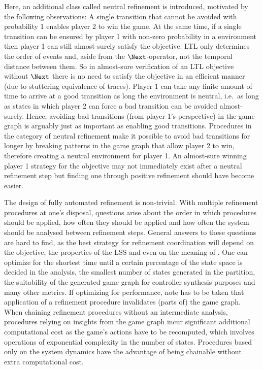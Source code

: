 Here, an additional class called neutral refinement is introduced, motivated by the following observations:
A single  transition that cannot be avoided with probability 1 enables player 2 to win the game.
At the same time, if a single  transition can be ensured by player 1 with non-zero probability in a  environment then player 1 can still almost-surely satisfy the objective. 
LTL only determines the order of events and, aside from the $\Next$-operator, not the temporal distance between them.
So in almost-sure verification of an LTL objective without $\Next$ there is no need to satisfy the objective in an efficient manner (due to stuttering equivalence of traces). %
Player 1 can take any finite amount of time to arrive at a good transition as long the environment is neutral, i.e.\ as long as states in which player 2 can force a bad transition can be avoided almost-surely.
Hence, avoiding bad transitions (from player 1's perspective) in the game graph is arguably just as important as enabling good transitions.
Procedures in the category of neutral refinement make it possible to avoid bad transitions for longer by breaking patterns in the game graph that allow player 2 to win, therefore creating a neutral environment for player 1.
An almost-sure winning player 1 strategy for the objective may not immediately exist after a neutral refinement step but finding one through positive refinement should have become easier.

The design of fully automated refinement is non-trivial.
With multiple refinement procedures at one's disposal, questions arise about the order in which procedures should be applied, how often they should be applied and how often the system should be analysed between refinement steps.
General answers to these questions are hard to find, as the best strategy for refinement coordination will depend on the objective, the properties of the LSS and even on the meaning of .
One can optimize for the shortest time until a certain percentage of the state space is decided in the analysis, the smallest number of states generated in the partition, the suitability of the generated game graph for controller synthesis purposes and many other metrics.
If optimizing for performance, note has to be taken that application of a refinement procedure invalidates (parts of) the game graph.
When chaining refinement procedures without an intermediate analysis, procedures relying on insights from the game graph incur significant additional computational cost as the game's actions have to be recomputed, which involves operations of exponential complexity in the number of states.
Procedures based only on the system dynamics have the advantage of being chainable without extra computational cost.


